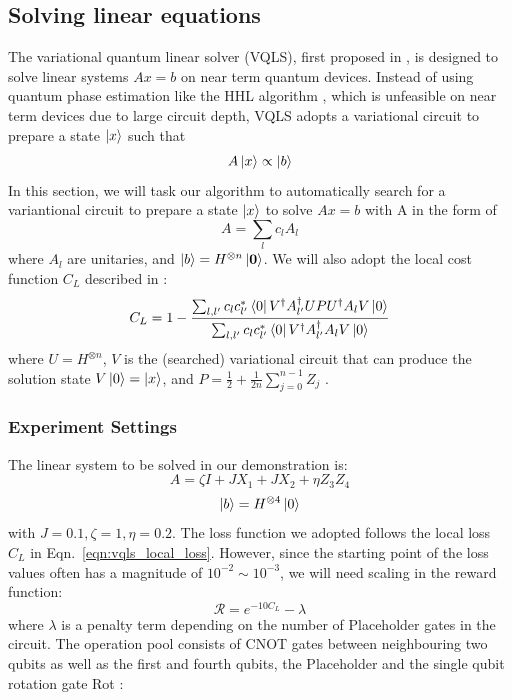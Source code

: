 \documentclass{ieeeaccess}
\begin{document}
\subsection{Solving linear equations}
The variational quantum linear solver (VQLS), first proposed in \cite{Bravo-Prieto_undated-oq}, is designed to solve linear systems $Ax=b$ on near term quantum devices. Instead of using quantum phase estimation like the HHL algorithm \cite{HHL}, which is unfeasible on near term devices due to large circuit depth, VQLS adopts a variational circuit to prepare a state $\ket{x}$ such that 
\begin{equation}
    A\ket{x} \propto \ket{b}
\end{equation}
In this section, we will task our algorithm to automatically search for a variantional circuit to prepare a state $\ket{x}$ to solve $Ax = b$ with A in the form of 
\begin{equation}
    A = \sum_l c_l A_l
\end{equation}
where $A_l$ are unitaries, and $\ket{b} = H^{\otimes n}\ket{\mathbf{0}}$.
\noindent
We will also adopt the local cost function $C_L$ described in \cite{Bravo-Prieto_undated-oq}:
\begin{equation}\label{eqn:vqls_local_loss}
C_{L}=1-\frac{\sum_{l, l^{\prime}} c_{l} c_{l^{\prime}}^{*}\bra{0}V^{\dagger} A_{l^{\prime}}^{\dagger} U P U^{\dagger} A_{l} V\ket{0}}{\sum_{l, l^{\prime}} c_{l} c_{l^{\prime}}^{*}\bra{0}V^{\dagger} A_{l^{\prime}}^{\dagger} A_{l} V\ket{0}}
\end{equation}
where $U=H^{\otimes n}$, $V$ is the (searched) variational circuit that can produce the solution state $V\ket{0} = \ket{x}$, and $P=\frac{1}{2}+\frac{1}{2 n} \sum_{j=0}^{n-1} Z_{j}$ \cite{pennylane_vqls}.

\subsubsection{Experiment Settings}
The linear system to be solved in our demonstration is:
\begin{equation}
    A = \zeta  I + J X_1 + J X_2  + \eta Z_3 Z_4
\end{equation}
\begin{equation}
    \ket{b} = H^{\otimes 4}\ket{0}
\end{equation}
with $J = 0.1, \zeta = 1, \eta = 0.2$.
The loss function we adopted follows the local loss $C_L$ in Eqn.~\ref{eqn:vqls_local_loss}. However, since the starting point of the loss values often has a magnitude of $10^{-2}\sim 10^{-3}$, we will need scaling in the reward function:
\begin{equation}
    \mathcal{R} = e^{-10 C_L}-\lambda
\end{equation}
where $\lambda$ is a penalty term depending on the number of Placeholder gates in the circuit. The operation pool consists of CNOT gates between neighbouring two qubits as well as the first and fourth qubits, the Placeholder and the single qubit rotation gate Rot \cite{nielsen00}:
\end{document}
